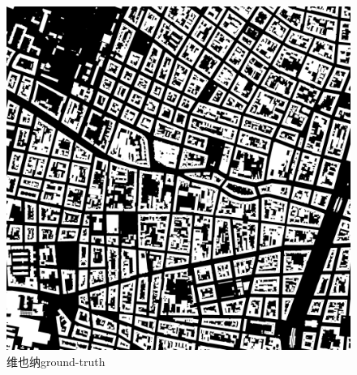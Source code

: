 \begin{figure}[htbp]
\begin{minipage}[t]{0.49\linewidth}
        \includegraphics[width=1\linewidth]{Figures/结果/vienna8_gt.png}
        \caption{维也纳ground-truth}
        \label{Fig:test_image_1_gt}
    \end{minipage}
    
\end{figure}

